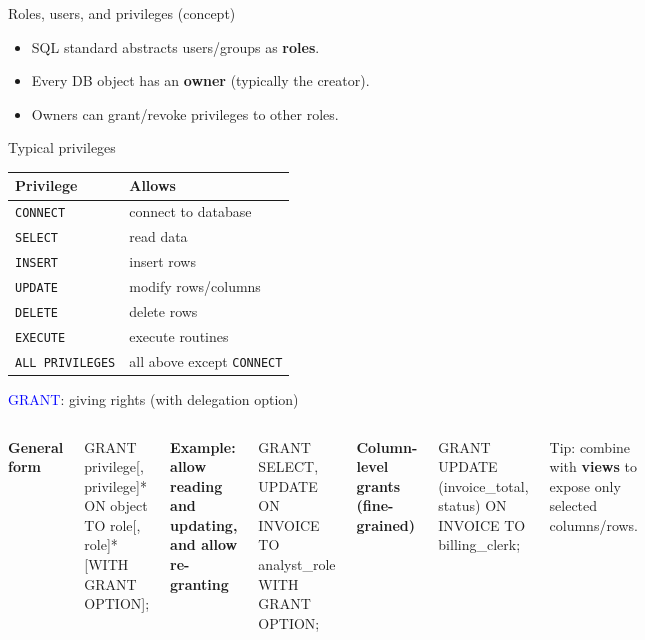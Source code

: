 \documentclass[10pt,aspectratio=169]{beamer}
\newcommand{\sqlk}[1]{\textcolor{blue}{#1}}
\begin{document}
\begin{frame}{Roles, users, and privileges (concept)}
\small
\begin{itemize}
  \item SQL standard abstracts users/groups as \textbf{roles}.
  \item Every DB object has an \textbf{owner} (typically the creator).
  \item Owners can grant/revoke privileges to other roles.
\end{itemize}
\vspace{1mm}

\begin{block}{Typical privileges}
\footnotesize
\begin{tabular}{@{}ll@{}}
\toprule
\textbf{Privilege} & \textbf{Allows}\\
\midrule
\texttt{CONNECT} & connect to database\\
\texttt{SELECT} & read data\\
\texttt{INSERT} & insert rows\\
\texttt{UPDATE} & modify rows/columns\\
\texttt{DELETE} & delete rows\\
\texttt{EXECUTE} & execute routines\\
\texttt{ALL PRIVILEGES} & all above except \texttt{CONNECT}\\
\bottomrule
\end{tabular}
\end{block}
\end{frame}

\begin{frame}[fragile]{\sqlk{GRANT}: giving rights (with delegation option)}
\small
\begin{columns}[T,onlytextwidth]
\textbf{General form}
\begin{codesql}
GRANT privilege[, privilege]*
ON object
TO role[, role]*
[WITH GRANT OPTION];
\end{codesql}

\textbf{Example: allow reading and updating, and allow re-granting}
\begin{codesql}
GRANT SELECT, UPDATE
ON INVOICE
TO analyst_role
WITH GRANT OPTION;
\end{codesql}

\textbf{Column-level grants (fine-grained)}
\begin{codesql}
GRANT UPDATE (invoice_total, status)
ON INVOICE
TO billing_clerk;
\end{codesql}

\vspace{1mm}
\footnotesize Tip: combine with \textbf{views} to expose only selected columns/rows.
\end{columns}
\end{frame}
\end{document}
